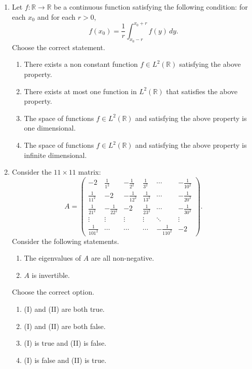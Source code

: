 \documentclass[11pt, a4paper]{article}
\begin{document}
\begin{enumerate}
  \item Let $f: \mathbb{R} \to \mathbb{R}$ be a continuous function satisfying the following condition: for each $x_0$ and for each $r > 0$,
  \[
    f(x_0) = \frac{1}{r} \int_{x_0 - r}^{x_0 + r} f(y)\,dy.
  \]
  Choose the correct statement.
  \begin{enumerate}[label=(\alph*)]
    \item There exists a non constant function $f \in L^2(\mathbb{R})$ satisfying the above property.
    \item There exists at most one function in $L^2(\mathbb{R})$ that satisfies the above property.
    \item The space of functions $f \in L^2(\mathbb{R})$ and satisfying the above property is one dimensional.
    \item The space of functions $f \in L^2(\mathbb{R})$ and satisfying the above property is infinite dimensional.
  \end{enumerate}

  \item Consider the $11 \times 11$ matrix:
  \[
    A = \begin{pmatrix}
      -2 & \frac{1}{1^2} & -\frac{1}{2^2} & \frac{1}{3^2} & \cdots & -\frac{1}{10^2} \\[4pt]
      \frac{1}{11^2} & -2 & -\frac{1}{12^2} & \frac{1}{13^2} & \cdots & -\frac{1}{20^2} \\[4pt]
      \frac{1}{21^2} & -\frac{1}{22^2} & -2 & \frac{1}{23^2} & \cdots & -\frac{1}{30^2} \\[4pt]
      \vdots & \vdots & \vdots & \vdots & \ddots & \vdots \\[4pt]
      \frac{1}{101^2} & \cdots & \cdots & \cdots & -\frac{1}{110^2} & -2
    \end{pmatrix}.
  \]
  Consider the following statements.
  \begin{enumerate}[label=(\Roman*)]
    \item The eigenvalues of $A$ are all non-negative.
    \item $A$ is invertible.
  \end{enumerate}
  Choose the correct option.
  \begin{enumerate}[label=(\alph*)]
    \item (I) and (II) are both true.
    \item (I) and (II) are both false.
    \item (I) is true and (II) is false.
    \item (I) is false and (II) is true.
  \end{enumerate}


\end{enumerate}
\end{document}
